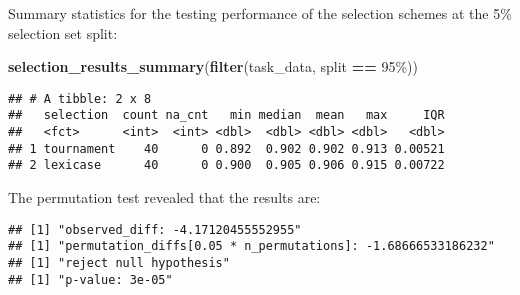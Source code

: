 \documentclass[
]{book}
\newenvironment{Shaded}{\begin{snugshade}}{\end{snugshade}}
\newcommand{\AttributeTok}[1]{\textcolor[rgb]{0.13,0.29,0.53}{#1}}
\newcommand{\DecValTok}[1]{\textcolor[rgb]{0.00,0.00,0.81}{#1}}
\newcommand{\FunctionTok}[1]{\textcolor[rgb]{0.13,0.29,0.53}{\textbf{#1}}}
\newcommand{\NormalTok}[1]{#1}
\newcommand{\OtherTok}[1]{\textcolor[rgb]{0.56,0.35,0.01}{#1}}
\newcommand{\SpecialCharTok}[1]{\textcolor[rgb]{0.81,0.36,0.00}{\textbf{#1}}}
\newcommand{\StringTok}[1]{\textcolor[rgb]{0.31,0.60,0.02}{#1}}
\begin{document}
Summary statistics for the testing performance of the selection schemes at the 5\% selection set split:

\begin{Shaded}
\begin{Highlighting}[]
\FunctionTok{selection\_results\_summary}\NormalTok{(}\FunctionTok{filter}\NormalTok{(task\_data, split }\SpecialCharTok{==} \StringTok{\textquotesingle{}95\%\textquotesingle{}}\NormalTok{))}
\end{Highlighting}
\end{Shaded}

\begin{verbatim}
## # A tibble: 2 x 8
##   selection  count na_cnt   min median  mean   max     IQR
##   <fct>      <int>  <int> <dbl>  <dbl> <dbl> <dbl>   <dbl>
## 1 tournament    40      0 0.892  0.902 0.902 0.913 0.00521
## 2 lexicase      40      0 0.900  0.905 0.906 0.915 0.00722
\end{verbatim}

The permutation test revealed that the results are:

\begin{Shaded}
\end{Shaded}

\begin{verbatim}
## [1] "observed_diff: -4.17120455552955"
## [1] "permutation_diffs[0.05 * n_permutations]: -1.68666533186232"
## [1] "reject null hypothesis"
## [1] "p-value: 3e-05"
\end{verbatim}
\end{document}
